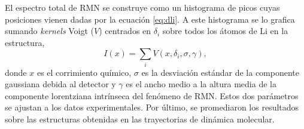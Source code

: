 El espectro total de RMN se construye como un histograma de picos cuyas posiciones
vienen dadas por la ecuación \ref{eq:dli}. A este histograma se lo grafica sumando 
\textit{kernels} Voigt ($V$) centrados en $\delta_i$ sobre todos los átomos de Li
en la estructura,
\begin{equation}\label{eq:nmr}
    I(x) = \sum_{i} V(x, \delta_{i}, \sigma, \gamma),
\end{equation}
donde $x$ es el corrimiento químico, $\sigma$ es la desviación estándar de la 
componente gaussiana debida al detector y $\gamma$ es el ancho medio a la altura 
media de la componente lorentziana intrínseca del fenómeno de RMN. Estos 
dos parámetros se ajustan a los datos experimentales. Por último, se promediaron
los resultados sobre las estructuras obtenidas en las trayectorias de dinámica 
molecular.

